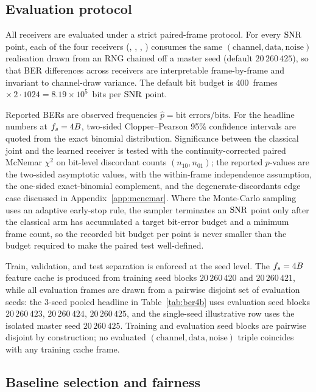 \subsection{Evaluation protocol}
\label{ssec:eval}

All receivers are evaluated under a strict paired-frame protocol. For every $\mathrm{SNR}$ point, each of the four receivers (\Serial{}, \ClassicalJoint{}, \LearnedHead{}, \Oracle{}) consumes the same $(\mathrm{channel}, \mathrm{data}, \mathrm{noise})$ realisation drawn from an RNG chained off a master seed (default $20\,260\,425$), so that BER differences across receivers are interpretable frame-by-frame and invariant to channel-draw variance. The default bit budget is $400$~frames~$\times\,2 \cdot 1024 = 8.19 \times 10^{5}$~bits per $\mathrm{SNR}$ point.

Reported BERs are observed frequencies $\hat{p} = \text{bit errors}/\text{bits}$. For the headline numbers at $f_s = 4B$, two-sided Clopper--Pearson 95\% confidence intervals are quoted from the exact binomial distribution. Significance between the classical joint and the learned receiver is tested with the continuity-corrected paired McNemar $\chi^2$ on bit-level discordant counts $(n_{10}, n_{01})$; the reported $p$-values are the two-sided asymptotic values, with the within-frame independence assumption, the one-sided exact-binomial complement, and the degenerate-discordants edge case discussed in Appendix~\ref{app:mcnemar}. Where the Monte-Carlo sampling uses an adaptive early-stop rule, the sampler terminates an $\mathrm{SNR}$ point only after the classical arm has accumulated a target bit-error budget and a minimum frame count, so the recorded bit budget per point is never smaller than the budget required to make the paired test well-defined.

Train, validation, and test separation is enforced at the seed level. The $f_s = 4B$ feature cache is produced from training seed blocks $20\,260\,420$ and $20\,260\,421$, while all evaluation frames are drawn from a pairwise disjoint set of evaluation seeds: the 3-seed pooled headline in Table~\ref{tab:ber4b} uses evaluation seed blocks $20\,260\,423$, $20\,260\,424$, $20\,260\,425$, and the single-seed illustrative row uses the isolated master seed $20\,260\,425$. Training and evaluation seed blocks are pairwise disjoint by construction; no evaluated $(\mathrm{channel}, \mathrm{data}, \mathrm{noise})$ triple coincides with any training cache frame.

\subsection{Baseline selection and fairness}
\label{ssec:fairness}

